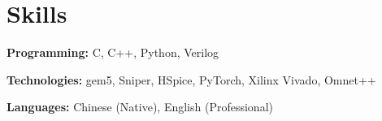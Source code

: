 \documentclass[letterpaper,11pt]{article}
\newcommand{\resumeSubHeadingListStart}{\begin{itemize}[leftmargin=0.15in, label={}]}
\newcommand{\resumeSubHeadingListEnd}{\end{itemize}}
\begin{document}

\section{Skills}
  \vspace{2pt}
  \resumeSubHeadingListStart
    \small{\item{
        \textbf{Programming:}{ C, C++, Python, Verilog} \\ \vspace{3pt}
        
        \textbf{Technologies:}{ gem5, Sniper, HSpice, PyTorch, Xilinx Vivado, Omnet++} \\ \vspace{3pt}
        
        \textbf{Languages:}{ Chinese (Native), English (Professional)}
        
    }}
  \resumeSubHeadingListEnd




        



\end{document}
